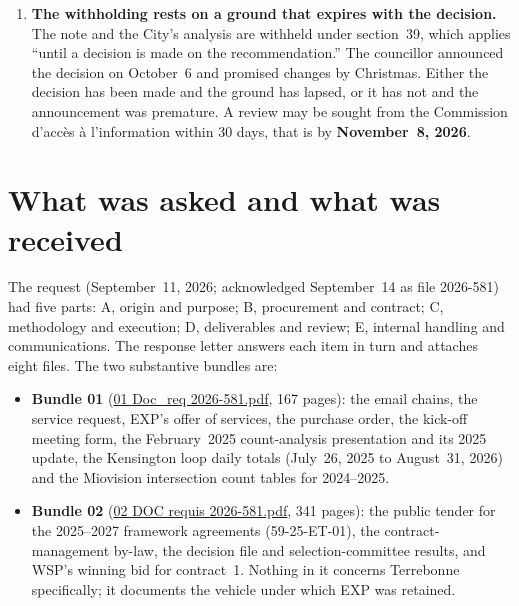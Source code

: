 \documentclass[11pt,letterpaper]{article}
\newcommand{\repourl}{https://github.com/OpenMobilityData/Terrebonne-access-requests}
\newcommand{\doc}[2]{\href{\repourl/blob/main/#1}{#2}}
\begin{document}
\begin{enumerate}[nosep]
\begin{minipage}[t]{\linewidth}
    like for like, the deck's own slides give 97--98\%, label January
    $-95$\%, and the counter gives about 93\% for the seasons entire. The
    two sources agree that the drop is steep;
    they differ in the absolute number, and only one of them yields ``four
    people.'' Whatever the
    explanation, a decision presented as data-driven rested on the one data
    point a careful analysis would have set aside first.\end{minipage}\vspace{0.35em}
\item \begin{minipage}[t]{\linewidth}\textbf{The withholding rests on a ground that expires with the
    decision.} The note and the City's analysis are withheld under
    section~39, which applies ``until a decision is made on the
    recommendation.'' The councillor announced the decision on October~6 and
    promised changes by Christmas. Either the decision has been made and the
    ground has lapsed, or it has not and the announcement was premature. A
    review may be sought from the Commission d'acc\`es \`a l'information
    within 30 days, that is by \textbf{November~8, 2026}.\end{minipage}\vspace{0.35em}
\end{enumerate}

\section{What was asked and what was received}

The request (September~11, 2026; acknowledged September~14 as file 2026-581)
had five parts: A, origin and purpose; B, procurement and contract; C,
methodology and execution; D, deliverables and review; E, internal handling
and communications. The response letter answers each item in turn and
attaches eight files. The two substantive bundles are:

\begin{itemize}[nosep]
  \item \textbf{Bundle 01} (\doc{2026-581/raw/01_emails_mandate_counts.pdf}{01 Doc\_req
    2026-581.pdf}, 167 pages): the email chains, the service request, EXP's
    offer of services, the purchase order, the kick-off meeting form, the
    February~2025 count-analysis presentation and its 2025 update, the
    Kensington loop daily totals (July~26, 2025 to August~31, 2026) and the
    Miovision intersection count tables for 2024--2025.
  \item \textbf{Bundle 02} (\doc{2026-581/raw/02_framework_agreement_tender.pdf}{02 DOC requis
    2026-581.pdf}, 341 pages): the public tender for the 2025--2027
    framework agreements (59-25-ET-01), the contract-management by-law, the
    decision file and selection-committee results, and WSP's winning bid for
    contract~1. Nothing in it concerns Terrebonne specifically; it documents
    the vehicle under which EXP was retained.
\end{itemize}
\end{document}
